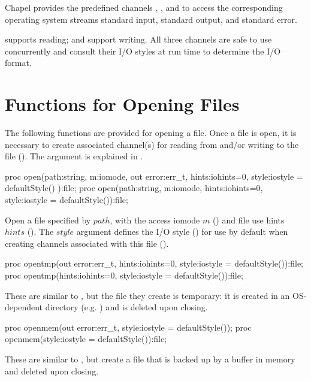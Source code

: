 Chapel provides the predefined channels , ,
and  to access the corresponding operating system streams
standard input, standard output, and standard error.

 supports reading;
 and  support writing.
All three channels are safe to use concurrently and
consult their I/O styles at run time to determine the I/O format.


\section{Functions for Opening Files}
\label{IO_open_file}

The following functions are provided for opening a file.
Once a file is open, it is necessary to create associated channel(s)
for reading from and/or writing to the file ().
The  argument is explained in .

\begin{protohead}
proc open(path:string, m:iomode, out error:err_t, hints:iohints=0, style:iostyle = defaultStyle()
          ):file;
proc open(path:string, m:iomode, hints:iohints=0, style:iostyle = defaultStyle()):file;
\end{protohead}
\begin{protobody}
Open a file specified by $path$, with
the access iomode $m$ ()
and file use hints $hints$ ().
The $style$ argument defines the I/O style ()
for use by default when creating channels associated with this file
().
\end{protobody}

\begin{protohead}
proc opentmp(out error:err_t, hints:iohints=0, style:iostyle = defaultStyle()):file;
proc opentmp(hints:iohints=0, style:iostyle = defaultStyle()):file;
\end{protohead}
\begin{protobody}
These are similar to , but the file they create is temporary:
it is created in an OS-dependent directory (e.g. )
and is deleted upon closing.
\end{protobody}

\begin{protohead}
proc openmem(out error:err_t, style:iostyle = defaultStyle());
proc openmem(style:iostyle = defaultStyle()):file;
\end{protohead}
\begin{protobody}
These are similar to , but create a file
that is backed up by a buffer in memory and deleted upon closing.
\end{protobody}


